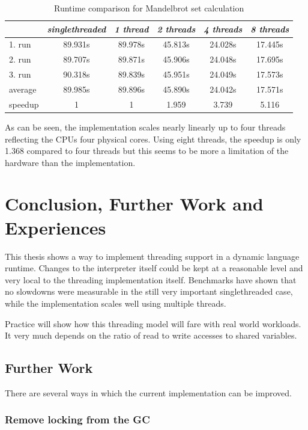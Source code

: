 \documentclass[bachelor,english]{hgbthesis}
\begin{document}
\begin{table}
\caption{Runtime comparison for Mandelbrot set calculation}
\label{benchmark:mandel}
\begin{tabular}{|l||c||c|c|c|c|} \hline
& \emph{singlethreaded} & \emph{1 thread} & \emph{2 threads} & \emph{4 threads} & \emph{8 threads} \\
\hline
1. run  & 89.931s & 89.978s & 45.813s & 24.028s & 17.445s \\
\hline
2. run  & 89.707s & 89.871s & 45.906s & 24.048s & 17.695s \\
\hline
3. run  & 90.318s & 89.839s & 45.951s & 24.049s & 17.573s \\
\hline
average & 89.985s & 89.896s & 45.890s & 24.042s & 17.571s  \\
\hline
speedup & 1       &  1      &  1.959  &  3.739  &  5.116  \\
\hline
\end{tabular}
\end{table}

As can be seen, the implementation scales nearly linearly up to four threads reflecting the CPUs four physical cores. Using eight threads, the speedup is only 1.368 compared to four threads but this seems to be more a limitation of the hardware than the implementation.

\chapter{Conclusion, Further Work and Experiences}

This thesis shows a way to implement threading support in a dynamic language runtime. Changes to the interpreter itself could be kept at a reasonable level and very local to the threading implementation itself. Benchmarks have shown that no slowdowns were measurable in the still very important singlethreaded case, while the implementation scales well using multiple threads.

Practice will show how this threading model will fare with real world workloads. It very much depends on the ratio of read to write accesses to shared variables.

\section{Further Work}

There are several ways in which the current implementation can be improved.

\subsection{Remove locking from the GC}
\end{document}
